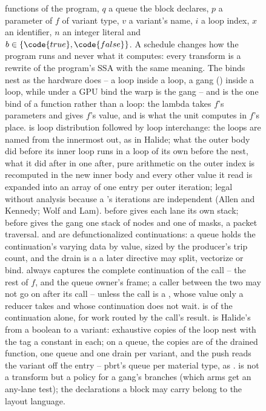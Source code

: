 \begin{figure}[b]
\begin{minipage}{0.62\linewidth}
{functions of the program, $q$ a queue the block declares, $p$ a parameter of $f$
of variant type, $v$ a variant's name, $i$ a loop index, $x$ an identifier, $n$
an integer literal and
$b \in \{\code{true}, \code{false}\}$. A schedule changes how the program runs
and never what it computes: every transform is a rewrite of the program's SSA
with the same meaning. The binds nest as the hardware does -- a 
loop inside a  loop, a gang () inside a
 loop, while under a GPU bind the warp is the gang -- and
 is the one bind of a function rather than a
loop: the lambda takes
$f$'s parameters and gives $f$'s value, and is what the unit computes in $f$'s
place.  is loop distribution followed by loop interchange: the
loops are named from the innermost out, as in Halide; what the outer body
did before its inner loop runs in a loop of its own before the nest, what
it did after in one after, pure arithmetic on the outer index is recomputed
in the new inner body and every other value it read is expanded into an
array of one entry per outer iteration; legal without analysis because a
's iterations are independent (Allen and Kennedy; Wolf and
Lam).  before  gives each lane its own stack;
 before  gives the gang one stack of nodes and
one of masks, a packet traversal.  and  are
defunctionalized continuations: a queue holds the continuation's varying data by
value, sized by the producer's trip count, and the drain is a  a
later directive may split, vectorize or bind.  always captures the
complete continuation of the call -- the rest of $f$, and the queue owner's
frame; a caller between the two may not go on after its call -- unless the
call is a , whose value only a reducer takes and whose
continuation does not wait.  is  of the continuation
alone, for work routed by the call's result.  is Halide's
 from a boolean to a variant: exhaustive copies of the loop
nest with the tag a constant in each; on a queue, the copies are of the
drained function, one queue and one drain per variant, and the push reads
the variant off the entry -- pbrt's queue per material type, as
.  is not a transform but a
policy for a gang's branches (which arms get an any-lane test); the
 declarations a block may carry belong to the layout language.}
\label{fig:schedule-grammar}
\end{minipage}
\end{figure}
